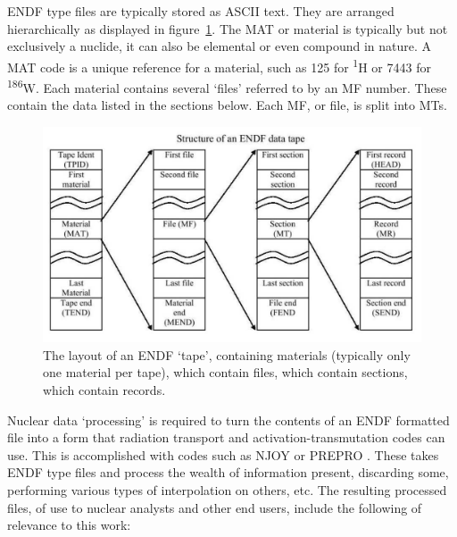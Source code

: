 ENDF type files are typically stored as ASCII  text. They are arranged hierarchically as displayed in figure~\ref{fig:endf}. The MAT or material is typically but not exclusively a nuclide, it can also be elemental or even compound in nature. A MAT code is a unique reference for a material, such as 125 for \textsuperscript{1}H or 7443 for \textsuperscript{186}W. Each material contains several `files' referred to by an MF number. These contain the data listed in the sections below. Each MF, or file, is split into MTs. 

\begin{figure}[ht]
  \includegraphics[width=\textwidth]{endf_architecture}
  \caption{The layout of an ENDF `tape', containing materials (typically only one material per tape), which contain files, which contain sections, which contain records.}
  \label{fig:endf}
\end{figure}

Nuclear data `processing' is required to turn the contents of an ENDF formatted file into a form that radiation transport and activation-transmutation codes can use. This is accomplished with codes such as NJOY \cite{MacFarlane2010} or PREPRO \cite{cullen2017}. These takes ENDF type files and process the wealth of information present, discarding some, performing various types of interpolation on others, etc. The resulting processed files, of use to nuclear analysts and other end users, include the following of relevance to this work:

